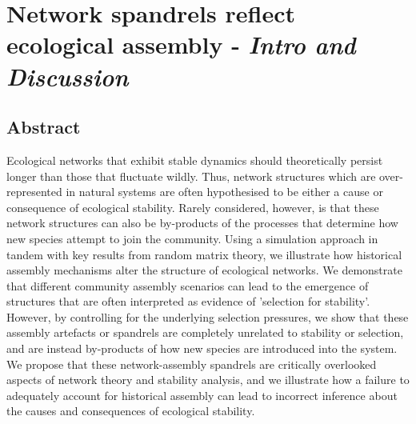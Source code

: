 \section*{Network spandrels reflect ecological assembly \citep{Maynard2018} - \textit{Intro  and Discussion}}

\subsection*{Abstract}
Ecological networks that exhibit stable dynamics should theoretically persist longer than those that fluctuate wildly. Thus, network structures which are over-represented in natural systems are often hypothesised to be either a cause or consequence of ecological stability. Rarely considered, however, is that these network structures can also be by-products of the processes that determine how new species attempt to join the community. Using a simulation approach in tandem with key results from random matrix theory, we illustrate how historical assembly mechanisms alter the structure of ecological networks. We demonstrate that different community assembly scenarios can lead to the emergence of structures that are often interpreted as evidence of 'selection for stability'. However, by controlling for the underlying selection pressures, we show that these assembly artefacts or spandrels are completely unrelated to stability or selection, and are instead by-products of how new species are introduced into the system. We propose that these network-assembly spandrels are critically overlooked aspects of network theory and stability analysis, and we illustrate how a failure to adequately account for historical assembly can lead to incorrect inference about the causes and consequences of ecological stability.


